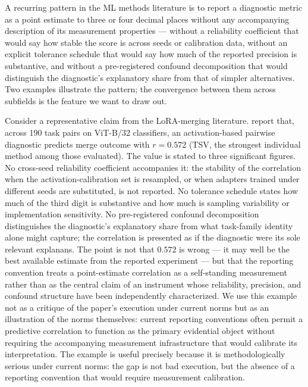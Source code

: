 \documentclass[10pt]{article}
\begin{document}
A recurring pattern in the ML methods literature is to report a
diagnostic metric as a point estimate to three or four decimal
places without any accompanying description of its measurement
properties --- without a reliability coefficient that would say how
stable the score is across seeds or calibration data, without an
explicit tolerance schedule that would say how much of the reported
precision is substantive, and without a pre-registered confound
decomposition that would distinguish the diagnostic's explanatory
share from that of simpler alternatives. Two examples illustrate
the pattern; the convergence between them across subfields is the
feature we want to draw out.

Consider a representative claim from the LoRA-merging literature.
\citet{zhou2026demystifying} report that, across 190 task pairs on
ViT-B/32 classifiers, an activation-based pairwise diagnostic
predicts merge outcome with $r = 0.572$ (TSV, the strongest
individual method among those evaluated). The value is stated to
three significant figures. No cross-seed reliability coefficient
accompanies it: the stability of the correlation when the
activation-calibration set is resampled, or when adapters trained
under different seeds are substituted, is not reported. No tolerance
schedule states how much of the third digit is substantive and how
much is sampling variability or implementation sensitivity. No
pre-registered confound decomposition distinguishes the diagnostic's
explanatory share from what task-family identity alone might
capture; the correlation is presented as if the diagnostic were its
sole relevant explanans. The point is not that $0.572$ is wrong ---
it may well be the best available estimate from the reported
experiment --- but that the reporting convention treats a
point-estimate correlation as a self-standing measurement rather
than as the central claim of an instrument whose reliability,
precision, and confound structure have been independently
characterized.
We use this example not as a critique of the paper's execution
under current norms but as an illustration of the norms themselves:
current reporting conventions often permit a predictive correlation
to function as the primary evidential object without requiring the
accompanying measurement infrastructure that would calibrate its
interpretation.
The example is useful precisely because it is methodologically
serious under current norms: the gap is not bad execution, but
the absence of a reporting convention that would require
measurement calibration.
\end{document}
